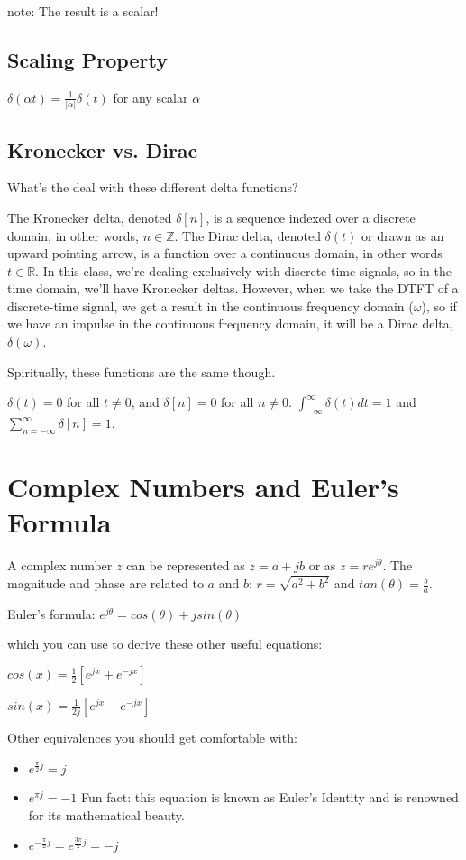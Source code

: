 \documentclass[11pt]{article}
\begin{document}
note: The result is a scalar!

\subsection{Scaling Property}

$\delta(\alpha t)= \frac{1}{|\alpha|} \delta(t)$ for any scalar $\alpha$

\subsection{Kronecker vs. Dirac}

What's the deal with these different delta functions? 

The Kronecker delta, denoted $\delta[n]$, is a sequence indexed over a discrete domain, in other words, $n \in \mathbb{Z}$. The Dirac delta, denoted $\delta(t)$ or drawn as an upward pointing arrow, is a function over a continuous domain, in other words $t \in \mathbb{R}$. In this class, we're dealing exclusively with discrete-time signals, so in the time domain, we'll have Kronecker deltas. However, when we take the DTFT of a discrete-time signal, we get a result in the continuous frequency domain ($\omega$), so if we have an impulse in the continuous frequency domain, it will be a Dirac delta, $\delta(\omega)$.

Spiritually, these functions are the same though. 

$\delta(t) = 0$ for all $t \neq 0$, and $\delta[n] = 0$ for all $n \neq 0$. 
$\int_{-\infty}^\infty \delta(t) dt = 1$ and $\sum\limits_{n=-\infty}^\infty \delta[n] = 1$.

\section{Complex Numbers and Euler's Formula}
A complex number $z$ can be represented as $z=a+jb$ or as $z=re^{j\theta}$. The magnitude and phase are related to $a$ and $b$: $r=\sqrt{a^2+b^2}$ and $tan(\theta)=\frac{b}{a}$.

Euler's formula:
$e^{j\theta} = cos(\theta)+jsin(\theta)$


which you can use to derive these other useful equations:

$cos(x) = \frac{1}{2} \left[e^{j x} + e^{-j x} \right]$

$sin(x) = \frac{1}{2j} \left[e^{j x} - e^{-j x} \right]$

Other equivalences you should get comfortable with:
\begin{itemize}
	\item $e^{\frac{\pi}{2} j} = j$
	\item $e^{\pi j} = -1$ Fun fact: this equation is known as Euler's Identity and is renowned for its mathematical beauty. 
	\item $e^{-\frac{\pi}{2} j} = e^{\frac{3\pi}{2} j} = -j$
\end{itemize}
\end{document}
